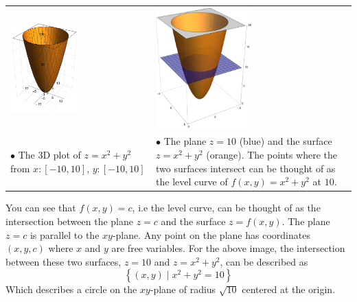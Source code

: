 \documentclass[14pt]{article}
\begin{document}
	\begin{center}
		\begin{tabular}{l l}
			\includegraphics[width=0.5\textwidth]{3d-graph_2} & \includegraphics[width=0.5\textwidth]{3d-graph_3}\\
			$\bullet$ \footnotesize The 3D plot of $z = x^2 + y^2$ from $x: [-10, 10]$, $y: [-10, 10]$ & $\bullet$ \footnotesize The plane $z = 10$ (blue) and the surface $z = x^2 + y^2$ (orange). The points where the two surfaces intersect can be thought of as the level curve of $f(x, y) = x^2 + y^2$ at $10$.
		\end{tabular}
	\end{center}
	You can see that $f(x, y) = c$, i.e the level curve, can be thought of as the intersection between the plane $z = c$ and the surface $z = f(x, y)$. The plane $z=c$ is parallel to the $xy$-plane. Any point on the plane has coordinates $(x, y, c)$ where $x$ and $y$ are free variables. For the above image, the intersection between these two surfaces, $z = 10$ and $z = x^2 + y^2$, can be described as 
	\begin{equation*}
		\left\{ (x, y) \mid x^2 + y^2 = 10 \right\} 
	\end{equation*}
	Which describes a circle on the $xy$-plane of radius $\sqrt{10}$ centered at the origin.
	 
\end{document}
